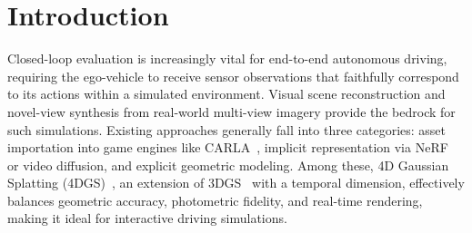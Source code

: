 \section{Introduction}
\label{sec:intro}


Closed-loop evaluation is increasingly vital for end-to-end autonomous driving, requiring the ego-vehicle to receive sensor observations that faithfully correspond to its actions within a simulated environment. Visual scene reconstruction and novel-view synthesis from real-world multi-view imagery provide the bedrock for such simulations. Existing approaches generally fall into three categories: asset importation into game engines like CARLA~\cite{dosovitskiy2017carla}, implicit representation via NeRF~\cite{mildenhall2021nerf} or video diffusion, and explicit geometric modeling. Among these, 4D Gaussian Splatting (4DGS)~\cite{wu20244d}, an extension of 3DGS~\cite{kerbl20233d} with a temporal dimension, effectively balances geometric accuracy, photometric fidelity, and real-time rendering, making it ideal for interactive driving simulations.

